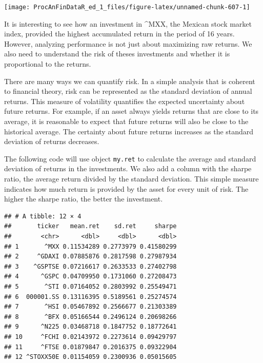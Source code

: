 \documentclass[11pt,]{book}
\newenvironment{Shaded}{\begin{snugshade}}{\end{snugshade}}
\newcommand{\KeywordTok}[1]{\textcolor[rgb]{0.27,0.27,0.27}{\textbf{#1}}}
\newcommand{\DataTypeTok}[1]{\textcolor[rgb]{0.27,0.27,0.27}{#1}}
\newcommand{\StringTok}[1]{\textcolor[rgb]{0.5,0.5,0.5}{#1}}
\newcommand{\OperatorTok}[1]{\textcolor[rgb]{0.81,0.36,0.00}{\textbf{#1}}}
\newcommand{\NormalTok}[1]{#1}
\begin{document}
\begin{center}\texttt{[image: ProcAnFinDataR\_ed\_1\_files/figure-latex/unnamed-chunk-607-1]} \end{center}

It is interesting to see how an investment in \^{}MXX, the Mexican stock
market index, provided the highest accumulated return in the period of
16 years. However, analyzing performance is not just about maximizing
raw returns. We also need to understand the risk of theses investments
and whether it is proportional to the returns.

There are many ways we can quantify risk. In a simple analysis that is
coherent to financial theory, risk can be represented as the standard
deviation of annual returns. This measure of volatility quantifies the
expected uncertainty about future returns. For example, if an asset
always yields returns that are close to its average, it is reasonable to
expect that future returns will also be close to the historical average.
The certainty about future returns increases as the standard deviation
of returns decreases.

The following code will use object \texttt{my.ret} to calculate the
average and standard deviation of returns in the investments. We also
add a column with the sharpe ratio, the average return divided by the
standard deviation. This simple measure indicates how much return is
provided by the asset for every unit of risk. The higher the sharpe
ratio, the better the investment.

\begin{Shaded}
\end{Shaded}

\begin{verbatim}
## # A tibble: 12 × 4
##       ticker   mean.ret    sd.ret     sharpe
##        <chr>      <dbl>     <dbl>      <dbl>
## 1       ^MXX 0.11534289 0.2773979 0.41580299
## 2     ^GDAXI 0.07885876 0.2817598 0.27987934
## 3    ^GSPTSE 0.07216617 0.2633533 0.27402798
## 4      ^GSPC 0.04709950 0.1731060 0.27208473
## 5       ^STI 0.07164052 0.2803992 0.25549471
## 6  000001.SS 0.13116395 0.5189561 0.25274574
## 7       ^HSI 0.05467892 0.2566677 0.21303389
## 8       ^BFX 0.05166544 0.2496124 0.20698266
## 9      ^N225 0.03468718 0.1847752 0.18772641
## 10     ^FCHI 0.02143972 0.2273614 0.09429797
## 11     ^FTSE 0.01879847 0.2016375 0.09322904
## 12 ^STOXX50E 0.01154059 0.2300936 0.05015605
\end{verbatim}
\end{document}

